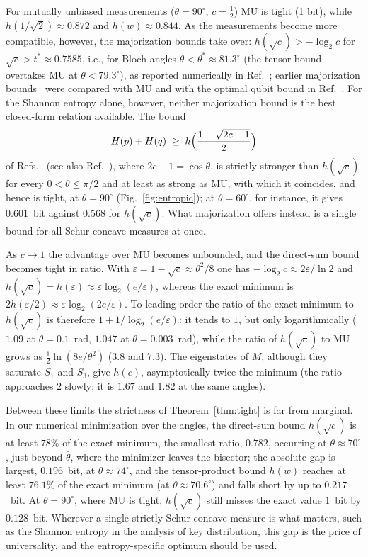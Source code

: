 \documentclass[aps,pra,twocolumn,superscriptaddress,nofootinbib,floatfix]{revtex4-2}
\theoremstyle{definition}
\newcommand{\sqc}{\sqrt{c}}
\begin{document}
For mutually unbiased measurements ($\theta=90^\circ$, $c=\frac12$) MU is tight
(1 bit), while $h(1/\sqrt2)\approx0.872$ and $h(w)\approx0.844$. As the
measurements become more compatible, however, the majorization bounds take
over: $h(\sqc)>-\log_2c$ for $\sqc>t^\ast\approx0.7585$, i.e., for Bloch angles
$\theta<\theta^\ast\approx81.3^\circ$ (the tensor bound overtakes MU at $\theta<79.3^\circ$), as
reported numerically in Ref.~\cite{Baek2019}; earlier majorization
bounds~\cite{FGG2013,PRZ2013} were compared with MU and with the optimal qubit
bound in Ref.~\cite{KTW2014}.
For the Shannon entropy alone, however, neither majorization bound is the best
closed-form relation available. The bound
\begin{equation}
  H(p)+H(q)\;\ge\;h\Bigl(\frac{1+\sqrt{2c-1}}{2}\Bigr)
  \label{eq:SR}
\end{equation}
of Refs.~\cite{SanchezRuiz1998,KTW2014} (see also Ref.~\cite{Coles2017}), where
$2c-1=\cos\theta$, is strictly stronger than $h(\sqc)$ for every
$0<\theta\le\pi/2$ and at least as strong as MU, with which it coincides, and
hence is tight, at $\theta=90^\circ$
(Fig.~\ref{fig:entropic}); at $\theta=60^\circ$, for instance, it gives
$0.601$~bit against $0.568$ for $h(\sqc)$. What majorization offers instead is a
single bound for all Schur-concave measures at once.

As $c\to1$ the advantage over MU becomes unbounded, and the direct-sum bound
becomes tight in ratio. With $\varepsilon=1-\sqc\approx\theta^2/8$ one has
$-\log_2c\approx2\varepsilon/\ln2$ and
$h(\sqc)=h(\varepsilon)\approx\varepsilon\log_2(e/\varepsilon)$, whereas the
exact minimum is $2h(\varepsilon/2)\approx\varepsilon\log_2(2e/\varepsilon)$.
To leading order the ratio of the exact minimum to $h(\sqc)$ is therefore
$1+1/\log_2(e/\varepsilon)$: it tends to $1$, but only logarithmically ($1.09$
at $\theta=0.1$~rad, $1.047$ at $\theta=0.003$~rad), while the ratio of $h(\sqc)$ to MU
grows as $\frac12\ln(8e/\theta^2)$ ($3.8$ and $7.3$). The eigenstates of $M$, although
they saturate $S_1$ and $S_3$, give $h(c)$, asymptotically twice the minimum
(the ratio approaches $2$ slowly; it is $1.67$ and $1.82$ at the same angles).

Between these limits the strictness of Theorem~\ref{thm:tight} is far from
marginal. In our numerical minimization over the angles, the direct-sum bound
$h(\sqc)$ is at least $78\%$ of the exact minimum, the smallest ratio, $0.782$,
occurring at
$\theta\approx70^\circ$, just beyond $\bar\theta$, where the minimizer leaves the
bisector; the absolute gap is largest, $0.196$~bit, at $\theta\approx74^\circ$,
and the tensor-product bound $h(w)$ reaches at least $76.1\%$ of the exact
minimum (at $\theta\approx70.6^\circ$) and falls short by up to $0.217$~bit. At
$\theta=90^\circ$, where MU is tight, $h(\sqc)$ still misses the exact value
$1$~bit by $0.128$~bit. Wherever a single strictly Schur-concave measure is
what matters, such as the Shannon entropy in the analysis of key distribution,
this gap is the price of universality, and the entropy-specific optimum should
be used.
\end{document}
